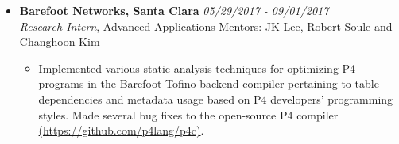 \documentclass[11pt,a4paper,sans]{moderncv}        %
\begin{document}
\begin{itemize}
	\item \textbf{Barefoot Networks, Santa Clara} \hfill \emph{05/29/2017 - 09/01/2017} \\
	\emph{Research Intern}, Advanced Applications \hfill Mentors: JK Lee, Robert Soule and Changhoon Kim
	\begin{itemize}
		\item Implemented various static analysis techniques for optimizing P4 programs in the Barefoot Tofino backend compiler
		pertaining to table dependencies and metadata usage based on P4
		developers' programming styles. Made several
		bug fixes to the open-source P4 compiler \href{https://github.com/p4lang/p4c}{(https://github.com/p4lang/p4c)}.
	\end{itemize}
	\vspace*{6pt}


\end{itemize}

\vspace*{2pt}
\end{document}
